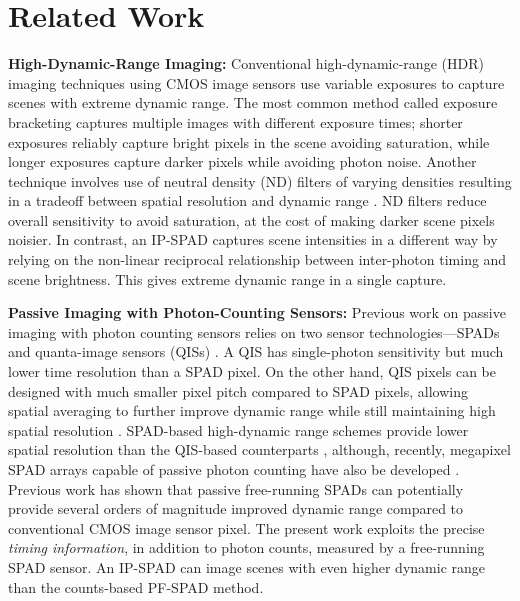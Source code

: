 \section{Related Work}
\noindent\textbf{High-Dynamic-Range Imaging:}
Conventional high-dynamic-range (HDR) imaging techniques using CMOS image
sensors use variable exposures to capture scenes with extreme dynamic range.
The most common method called exposure bracketing
\cite{Gupta_2013,Hasinoff2010} captures multiple images with different exposure
times; shorter exposures reliably capture bright pixels in the scene avoiding
saturation, while longer exposures capture darker pixels while avoiding photon
noise. Another technique involves use of neutral density (ND) filters of
varying densities resulting in a tradeoff between spatial resolution and
dynamic range \cite{Nayar_2000}. ND filters reduce overall sensitivity to avoid
saturation, at the cost of making darker scene pixels noisier.  In contrast, an
IP-SPAD captures scene intensities in a different way by relying on the
non-linear reciprocal relationship between inter-photon timing and scene
brightness. This gives extreme dynamic range in a single capture.

\smallskip
\noindent\textbf{Passive Imaging with Photon-Counting Sensors:}
Previous work on passive imaging with photon counting sensors relies on two
sensor technologies---SPADs and quanta-image sensors (QISs)
\cite{gnanasambandam2019megapixel}. A QIS has single-photon sensitivity but
much lower time resolution than a SPAD pixel. On the other hand, QIS pixels can
be designed with much smaller pixel pitch compared to SPAD pixels, allowing
spatial averaging to further improve dynamic range while still maintaining high
spatial resolution \cite{ma2020quanta}. SPAD-based high-dynamic range schemes
provide lower spatial resolution than the QIS-based counterparts
\cite{dutton2018high}, although, recently, megapixel SPAD arrays capable of
passive photon counting have also be developed \cite{Morimoto_2020}. Previous
work \cite{ingle2019high} has shown that passive free-running SPADs can
potentially provide several orders of magnitude improved dynamic range compared
to conventional CMOS image sensor pixel. The present work exploits the precise
\emph{timing information}, in addition to photon counts, measured by a
free-running SPAD sensor. An IP-SPAD can image scenes with even higher dynamic
range than the counts-based PF-SPAD method.

